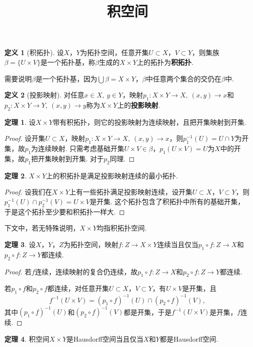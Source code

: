 \documentclass[12pt]{ctexart}
\title{\vspace{-2em}\textbf{积空间}\vspace{-2em}}
\date{ }
\theoremstyle{definition}
\newtheorem{definition}{定义}
\newtheorem{theorem}{定理}
\theoremstyle{plain}
\begin{document}
	\maketitle
	\begin{definition}[积拓扑]
		设$X$，$Y$为拓扑空间，任意开集$U\subset X$，$V\subset Y$，则集族$\beta=\{U\times V\}$是一个拓扑基，称$\beta$生成的$X\times Y$上的拓扑为\textbf{积拓扑}.
	\end{definition}
	需要说明$\beta$是一个拓扑基，因为$\bigcup \beta=X\times Y$，$\beta$中任意两个集合的交仍在$\beta$中.
	\begin{definition}[投影映射]
		对任意$x\in X,\ y\in Y$，映射$p_1:X\times Y\to X,\ (x,y)\to x$和$p_2:X\times Y\to Y,\ (x,y)\to y$称为$X\times Y$上的\textbf{投影映射}.
	\end{definition}
	\begin{theorem}
		设$X\times Y$带有积拓扑，则它的投影映射为连续映射，且把开集映射到开集.
	\end{theorem}
	\begin{proof}
		设开集$U\subset X$，映射$p_1:X\times Y\to X,\ (x,y)\to x$，则$p_1^{-1}(U)=U\cap Y$为开集，故$p_1$为连续映射. 只需考虑基础开集$U\times V\in\beta$，$p_1(U\times V)=U$为$X$中的开集，故$p_1$把开集映射到开集. 对于$p_2$同理.
	\end{proof}
	\begin{theorem}
		$X\times Y$上的积拓扑是满足投影映射连续的最小拓扑.
	\end{theorem}
	\begin{proof}
		设我们在$X\times Y$上有一些拓扑满足投影映射连续，设开集$U\subset X$，$V\subset Y$，则$p_1^{-1}(U)\cap p_2^{-1}(V)=U\times V$是开集. 这个拓扑包含了积拓扑中所有的基础开集，于是这个拓扑至少要和积拓扑一样大.
	\end{proof}
	下文中，若无特殊说明，$X\times Y$均指积拓扑空间.
	\begin{theorem}
		设$X$，$Y$，$Z$为拓扑空间，映射$f:Z\to X\times Y$连续当且仅当$p_1\circ f:Z\to X$和$p_2\circ f:Z\to Y$都连续.
	\end{theorem}
	\begin{proof}
		若$f$连续，连续映射的复合仍连续，故$p_1\circ f:Z\to X$和$p_2\circ f:Z\to Y$都连续.
		
		若$p_1\circ f$和$p_2\circ f$都连续，对任意开集$U\subset X$，$V\subset Y$，有$U\times V$是开集，且
		$$f^{-1}(U\times V)=(p_1\circ f)^{-1}(U)\cap(p_2\circ f)^{-1}(V),$$
		其中$(p_1\circ f)^{-1}(U)$和$(p_2\circ f)^{-1}(V)$都是开集，于是$f^{-1}(U\times V)$是开集，$f$连续.
	\end{proof}
	\begin{theorem}
		积空间$X\times Y$是Hausdorff空间当且仅当$X$和$Y$都是Hausdorff空间.
	\end{theorem}
\end{document}
